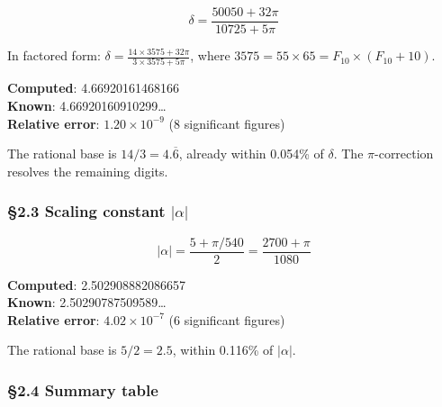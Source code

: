 \documentclass[
  11pt,
  a4paper]{article}
\begin{document}
\[\delta = \frac{50050 + 32\pi}{10725 + 5\pi}\]

In factored form:
\(\delta = \frac{14 \times 3575 + 32\pi}{3 \times 3575 + 5\pi}\), where
\(3575 = 55 \times 65 = F_{10} \times (F_{10} + 10)\).

\textbf{Computed}: 4.66920161468166\\
\textbf{Known}: 4.66920160910299\ldots{}\\
\textbf{Relative error}: \(1.20 \times 10^{-9}\) (8 significant figures)

The rational base is \(14/3 = 4.\overline{6}\), already within 0.054\%
of \(\delta\). The \(\pi\)-correction resolves the remaining digits.

\subsubsection{\texorpdfstring{§2.3 Scaling constant
\(|\alpha|\)}{§2.3 Scaling constant \textbar\textbackslash alpha\textbar{}}}\label{scaling-constant-alpha}

\[|\alpha| = \frac{5 + \pi/540}{2} = \frac{2700 + \pi}{1080}\]

\textbf{Computed}: 2.502908882086657\\
\textbf{Known}: 2.50290787509589\ldots{}\\
\textbf{Relative error}: \(4.02 \times 10^{-7}\) (6 significant figures)

The rational base is \(5/2 = 2.5\), within 0.116\% of \(|\alpha|\).

\subsubsection{§2.4 Summary table}\label{summary-table}
\end{document}

